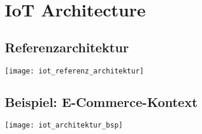 
\section{IoT Architecture}
\subsection{Referenzarchitektur}
\texttt{[image: iot\_referenz\_architektur]}
\subsection{Beispiel: E-Commerce-Kontext}
\texttt{[image: iot\_architektur\_bsp]}